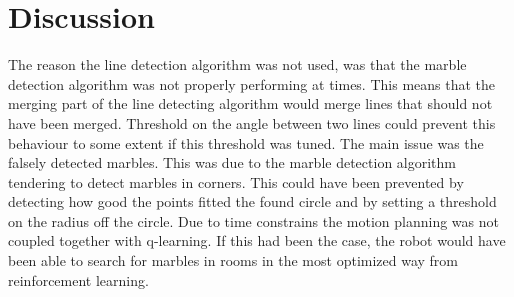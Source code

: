 \documentclass[../Head/Main.tex]{subfiles}
\begin{document}
\section{Discussion}

The reason the line detection algorithm was not used, was that the marble detection algorithm was not properly performing at times. This means that the merging part of the line detecting algorithm would merge lines that should not have been merged. Threshold on the angle between two lines could prevent this behaviour to some extent if this threshold was tuned. The main issue was the falsely detected marbles. This was due to the marble detection algorithm tendering to detect marbles in corners. This could have been prevented by detecting how good the points fitted the found circle and by setting a threshold on the radius off the circle. 
Due to time constrains the motion planning was not coupled together with q-learning. If this had been the case, the robot would have been able to search for marbles in rooms in the most optimized way from reinforcement learning.    
\end{document}
